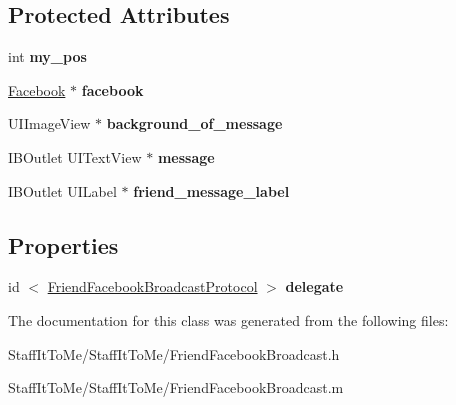 \subsection*{\-Protected \-Attributes}
\begin{DoxyCompactItemize}
\item 
\hypertarget{interface_friend_facebook_broadcast_a3150de9547bb46f5bc3bb35127e615a3}{
int {\bfseries my\-\_\-pos}}
\label{interface_friend_facebook_broadcast_a3150de9547bb46f5bc3bb35127e615a3}

\item 
\hypertarget{interface_friend_facebook_broadcast_a4fabdd8f956fbe32c9f84aca5af4dd02}{
\hyperlink{interface_facebook}{\-Facebook} $\ast$ {\bfseries facebook}}
\label{interface_friend_facebook_broadcast_a4fabdd8f956fbe32c9f84aca5af4dd02}

\item 
\hypertarget{interface_friend_facebook_broadcast_aa7e5a62d932320c039dc7804484f29f3}{
\-U\-I\-Image\-View $\ast$ {\bfseries background\-\_\-of\-\_\-message}}
\label{interface_friend_facebook_broadcast_aa7e5a62d932320c039dc7804484f29f3}

\item 
\hypertarget{interface_friend_facebook_broadcast_aefd8201be9238a3a9cbf6dc4f33a9773}{
\-I\-B\-Outlet \-U\-I\-Text\-View $\ast$ {\bfseries message}}
\label{interface_friend_facebook_broadcast_aefd8201be9238a3a9cbf6dc4f33a9773}

\item 
\hypertarget{interface_friend_facebook_broadcast_aa74066a300a235e8818edf9ad97b60ea}{
\-I\-B\-Outlet \-U\-I\-Label $\ast$ {\bfseries friend\-\_\-message\-\_\-label}}
\label{interface_friend_facebook_broadcast_aa74066a300a235e8818edf9ad97b60ea}

\end{DoxyCompactItemize}
\subsection*{\-Properties}
\begin{DoxyCompactItemize}
\item 
\hypertarget{interface_friend_facebook_broadcast_a0e40ed76eee26a45460502ebe76d5e6c}{
id\*
$<$ \hyperlink{protocol_friend_facebook_broadcast_protocol-p}{\-Friend\-Facebook\-Broadcast\-Protocol} $>$ {\bfseries delegate}}
\label{interface_friend_facebook_broadcast_a0e40ed76eee26a45460502ebe76d5e6c}

\end{DoxyCompactItemize}


\-The documentation for this class was generated from the following files\-:\begin{DoxyCompactItemize}
\item 
\-Staff\-It\-To\-Me/\-Staff\-It\-To\-Me/\-Friend\-Facebook\-Broadcast.\-h\item 
\-Staff\-It\-To\-Me/\-Staff\-It\-To\-Me/\-Friend\-Facebook\-Broadcast.\-m\end{DoxyCompactItemize}

